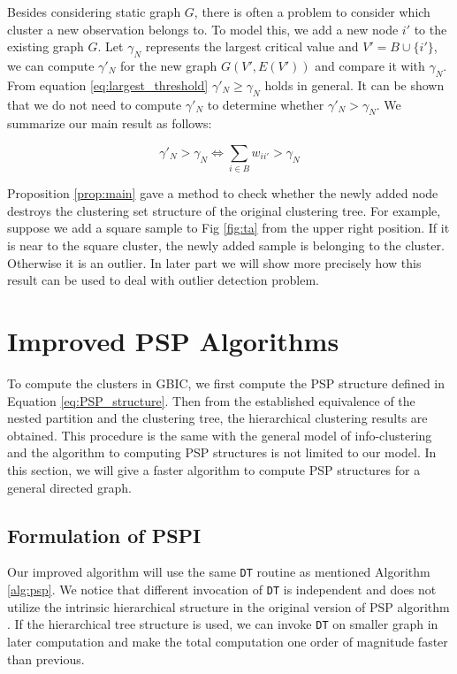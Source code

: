 Besides considering static graph $G$, there is often a problem to consider which cluster a new observation belongs to.
To model this, we add a new node $i'$ to the existing graph $G$. Let $\gamma_N$ represents the largest critical value
and $V'=B \cup \{i'\}$, we can compute $\gamma'_N$ for the new graph $G(V', E(V'))$ and compare it with $\gamma_N$. From equation \eqref{eq:largest_threshold} $\gamma'_N \geq \gamma_N$ holds in general. It can be shown that we do not need to compute $\gamma'_N$ to determine whether $\gamma'_N>\gamma_N$. We summarize our main result as follows:
\begin{proposition}\label{prop:main}
\begin{equation}
\gamma'_N > \gamma_N \iff  \sum_{i \in B} w_{ii'} > \gamma_N 
\end{equation}
\end{proposition}
Proposition \ref{prop:main} gave a method to check whether the newly added node destroys the clustering set structure of the original clustering tree.  For example, suppose we add a square sample to Fig \ref{fig:ta} from the upper right position. If it is near to the square cluster, the newly added sample is belonging to the cluster. Otherwise it is an outlier. In later part we will show more precisely how this result can be used to deal with outlier detection problem.
\section{Improved PSP Algorithms}\label{sec:alg}
To compute the clusters in GBIC, we first compute the PSP structure defined in Equation \eqref{eq:PSP_structure}. Then from the established equivalence of the nested partition and the clustering tree, the hierarchical
clustering results are obtained. This procedure is the same with the general model of info-clustering and the algorithm to computing PSP structures is not limited to our model. In this section, we will give a faster algorithm to compute PSP structures for a general directed graph.

\subsection{Formulation of PSPI}
Our improved algorithm will use the same \texttt{DT} routine as mentioned Algorithm \ref{alg:psp}. We notice that different invocation of \texttt{DT} is independent and does not utilize the intrinsic hierarchical structure in the original version of PSP algorithm \cite{narayanan}. If the hierarchical tree structure is used, we can invoke \texttt{DT} on smaller graph in later computation and make the total computation one order of magnitude faster than previous.

